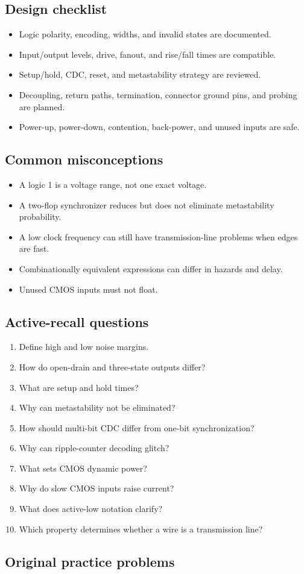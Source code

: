 \documentclass[10pt,letterpaper]{article}
\begin{document}
\subsection{Design checklist}
\begin{itemize}
  \item Logic polarity, encoding, widths, and invalid states are documented.
  \item Input/output levels, drive, fanout, and rise/fall times are compatible.
  \item Setup/hold, CDC, reset, and metastability strategy are reviewed.
  \item Decoupling, return paths, termination, connector ground pins, and probing are planned.
  \item Power-up, power-down, contention, back-power, and unused inputs are safe.
\end{itemize}\subsection{Common misconceptions}
\begin{itemize}
  \item A logic 1 is a voltage range, not one exact voltage.
  \item A two-flop synchronizer reduces but does not eliminate metastability probability.
  \item A low clock frequency can still have transmission-line problems when edges are fast.
  \item Combinationally equivalent expressions can differ in hazards and delay.
  \item Unused CMOS inputs must not float.
\end{itemize}\subsection{Active-recall questions}
\begin{enumerate}
  \item Define high and low noise margins.
  \item How do open-drain and three-state outputs differ?
  \item What are setup and hold times?
  \item Why can metastability not be eliminated?
  \item How should multi-bit CDC differ from one-bit synchronization?
  \item Why can ripple-counter decoding glitch?
  \item What sets CMOS dynamic power?
  \item Why do slow CMOS inputs raise current?
  \item What does active-low notation clarify?
  \item Which property determines whether a wire is a transmission line?
\end{enumerate}\subsection{Original practice problems}
\end{document}

